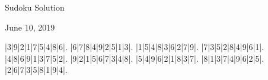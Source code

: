 \documentclass{article}
\begin{document}
\begin{center}
\Huge{Sudoku Solution}
\end{center}
\begin{center}
\Large{June 10, 2019}
\end{center}
\begin{sudoku}
|3|9|2|1|7|5|4|8|6|.
|6|7|8|4|9|2|5|1|3|.
|1|5|4|8|3|6|2|7|9|.
|7|3|5|2|8|4|9|6|1|.
|4|8|6|9|1|3|7|5|2|.
|9|2|1|5|6|7|3|4|8|.
|5|4|9|6|2|1|8|3|7|.
|8|1|3|7|4|9|6|2|5|.
|2|6|7|3|5|8|1|9|4|.
\end{sudoku}
\end{document}
